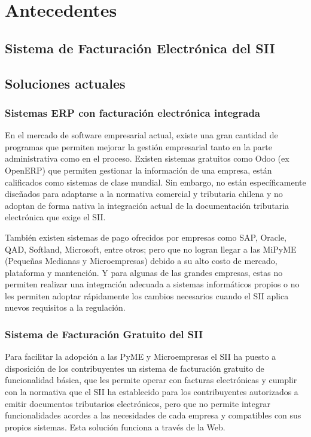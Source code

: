 \section{Antecedentes}

\subsection{Sistema de Facturación Electrónica del SII}

\subsection{Soluciones actuales}

\subsubsection{Sistemas ERP con facturación electrónica integrada}

En el mercado de software empresarial actual, existe una gran cantidad de programas que permiten mejorar la gestión empresarial tanto en la parte administrativa como en el proceso. Existen sistemas gratuitos como Odoo (ex OpenERP) que permiten gestionar la información de una empresa, están calificados como sistemas  de clase mundial. Sin embargo, no están específicamente diseñados para adaptarse a la normativa comercial y tributaria chilena y no adoptan de forma nativa la integración actual de la documentación tributaria electrónica que exige el SII.

También existen sistemas de pago ofrecidos por empresas como SAP, Oracle, QAD, Softland, Microsoft, entre otros; pero que no logran llegar a las MiPyME (Pequeñas Medianas y Microempresas) debido a su alto costo de mercado, plataforma y mantención. Y para algunas de las grandes empresas, estas no permiten realizar una integración adecuada a sistemas informáticos propios o no les permiten adoptar rápidamente los cambios necesarios cuando el SII aplica nuevos requisitos a la regulación.

\subsubsection{Sistema de Facturación Gratuito del SII}

Para facilitar la adopción a las PyME y Microempresas el SII ha puesto a disposición de los contribuyentes un sistema de facturación gratuito de funcionalidad básica, que les permite operar con facturas electrónicas y cumplir con la normativa que el SII ha establecido para los contribuyentes autorizados a emitir documentos tributarios electrónicos, pero que no permite integrar funcionalidades acordes a las necesidades de cada empresa y compatibles con sus propios sistemas. Esta solución funciona a través de la Web.

